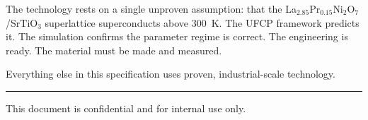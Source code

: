 \documentclass[11pt, a4paper]{article}
\begin{document}
The technology rests on a single unproven assumption: that the
La$_{2.85}$Pr$_{0.15}$Ni$_2$O$_7$/SrTiO$_3$ superlattice
superconducts above 300~K. The UFCP framework predicts it. The
simulation confirms the parameter regime is correct. The engineering
is ready. The material must be made and measured.

Everything else in this specification uses proven, industrial-scale
technology.

\vspace{2em}
\hrule
\vspace{0.5em}
{\color{nm-gray}\small This document is confidential and for internal use only.}
\end{document}
